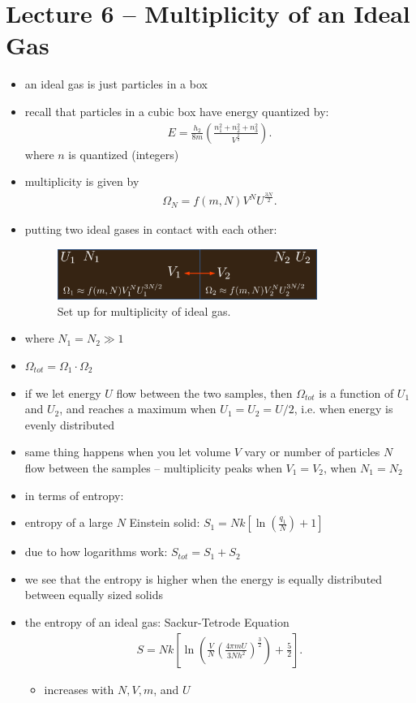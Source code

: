 \documentclass[10pt]{article}
\begin{document}
\section{Lecture 6 -- Multiplicity of an Ideal Gas}
\begin{itemize}
    \item an ideal gas is just particles in a box
    \item recall that particles in a cubic box have energy quantized by:
        \begin{align*}
            E = \frac{h_2}{8m} \left( \frac{n_1^2+n_2^2+n_3^2}{V^{\frac{2}{3}}} \right) 
        .\end{align*}
        where $n$ is quantized (integers)
    \item multiplicity is given by
        \begin{align*}
            \Omega_N = f(m,N)V^N U^{\frac{3N}{2}}
        .\end{align*}
    \item putting two ideal gases in contact with each other:
        \begin{figure}[H]
            \centering
            \includegraphics[width=0.8\textwidth]{multiplicityIdealGas}
            \caption{Set up for multiplicity of ideal gas.}
            \label{fig:multiplicityIdealGas}
        \end{figure}
    \item where $ N_1=N_2 \gg 1$
    \item $\Omega_{tot} = \Omega_1 \cdot \Omega_2$
    \item if we let energy $U$ flow between the two samples, then $\Omega_{tot}$ is a function of $U_1$ and $U_2$, and reaches a maximum when $U_1 = U_2 = U / 2$, i.e. when energy is evenly distributed
    \item same thing happens when you let volume  $V$ vary or number of particles  $N$ flow between the samples -- multiplicity peaks when $V_1 = V_2$, when $N_1 = N_2$
    \item in terms of entropy:
    \item entropy of a large $N$ Einstein solid: $S_1 = Nk[\ln(\frac{q_1}{N})+1]$
    \item due to how logarithms work: $S_{tot} = S_1 + S_2$
    \item we see that the entropy is higher when the energy is equally distributed between equally sized solids
    \item the entropy of an ideal gas: Sackur-Tetrode Equation
        \begin{align*}
            S = Nk \left[ \ln \left( \frac{V}{N} \left( \frac{4\pi mU}{3Nh^2} \right)^{\frac{3}{2}}  \right) + \frac{5}{2} \right] 
        .\end{align*}
        \begin{itemize}
            \item increases with $N, V, m$, and $U$
        \end{itemize}
\end{itemize}
\end{document}
